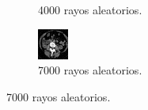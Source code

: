 \documentclass[a4paper]{article}
\begin{document}
\begin{figure}
\begin{subfigure}{0.4\linewidth}
  \caption{4000 rayos aleatorios.}
\end{subfigure}%
\begin{subfigure}{0.4\linewidth}
  \centering
  \includegraphics[width=0.6\linewidth]{rayos/tomo3-aleat7000}
  \caption{7000 rayos aleatorios.}
\end{subfigure}%


\end{figure}
\end{document}
